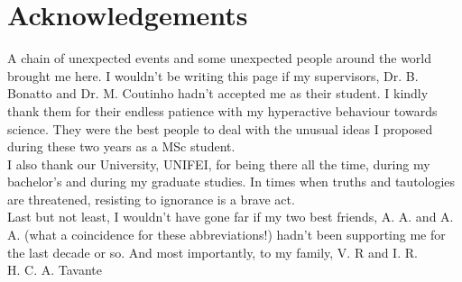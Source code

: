 \chapter*{Acknowledgements}

A chain of unexpected events and some unexpected people around the world brought me here. I wouldn't be writing this page if my supervisors, Dr. B. Bonatto and Dr. M. Coutinho hadn't accepted me as their student. I kindly thank them for their endless patience with my hyperactive behaviour towards science. They were the best people to deal with the unusual ideas I proposed during these two years as a MSc student.
\\

I also thank our University, UNIFEI, for being there all the time, during my bachelor's and during my graduate studies. In times when truths and tautologies are threatened, resisting to ignorance is a brave act.
\\

Last but not least, I wouldn't have gone far if my two best friends, A. A. and A. A. (what a coincidence for these abbreviations!) hadn't been supporting me for the last decade or so. And most importantly, to my family, V. R and I. R. 
\\

H. C. A. Tavante


